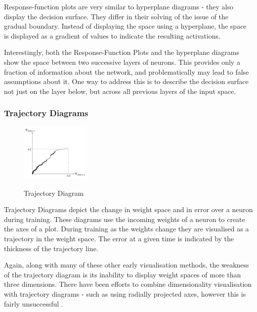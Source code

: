 \documentclass[a4paper,11pt,titlepage]{article}
\begin{document}
		Response-function plots are very similar to hyperplane diagrams - they also display the decision surface. They differ in their solving of the issue of the gradual boundary. Instead of displaying the space using a hyperplane, the space is displayed as a gradient of values to indicate the resulting activations.
		\par 
		Interestingly, both the Response-Function Plots and the hyperplane diagrams show the space between two successive layers of neurons. This provides only a fraction of information about the network, and problematically may lead to false assumptions about it. One way to address this is to describe the decision surface not just on the layer below, but across all previous layers of the input space.
		\par 
		
		\subsubsection{Trajectory Diagrams}
 		
 	\begin{figure}[H]
    			\centering	
			{{\includegraphics[width=0.3\textwidth]
    				{img/craven_trajectory.png} 
    			}}%
    			\caption{Trajectory Diagram}%
    		\label{fig:bond}
	\end{figure} 
 		
		Trajectory Diagrams \cite{Wejchert1990} depict the change in weight space and in error over a neuron during training. These diagrams use the incoming weights of a neuron to create the axes of a plot. During training as the weights change they are visualised as a trajectory in the weight space. The error at a given time is indicated by the thickness of the trajectory line.
		\par 	
		Again, along with many of these other early visualisation methods, the weakness of the trajectory diagram is its inability to display weight spaces of more than three dimensions. There have been efforts to combine dimensionality visualisation with trajectory diagrams - such as using radially projected axes, however this is fairly unsuccessful \cite{Craven1992}. 
		\par 
		
\end{document}

